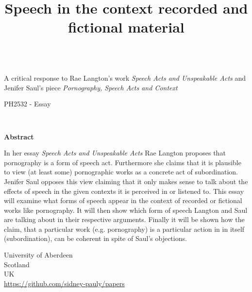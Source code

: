 \documentclass[14pt]{article}
\begin{document}
\title{Speech in the context recorded and fictional material}
\date{}



\fancyhf{}


\begin{titlepage}
  \begin{center}
    \Large
    \textbf{\thetitle}
    \\
    A critical response to Rae Langton's work \textit{Speech Acts and Unspeakable Acts}
    and Jenifer Saul's piece \textit{Pornography, Speech Acts and Context}
        
    \vspace{0.4cm}
    \large
    PH2532 - Essay
        
    \vspace{0.4cm}
    \textbf{\theauthor}\\
    \textbf{\theuoastudentid}

    \vspace{0.9cm}
    \textbf{Abstract}

  \end{center}

  In her essay \textit{Speech Acts and Unspeakable Acts} Rae Langton proposes that pornography is a form of speech act. Furthermore
  she claims that it is plausible to view (at least some) pornographic works as a concrete act of subordination. Jenifer Saul opposes this
  view claiming that it only makes sense to talk about the effects of speech in the given contexts it is perceived in or listened to. This essay will 
  examine what forms of speech appear in the context of recorded or fictional works like pornography. It will then show which form of speech 
  Langton and Saul are talking about in their respective arguments. Finally it will be shown how the claim, that a particular work (e.g. pornography)
  is a particular action in in itself (subordination), can be coherent in spite of Saul's objections.

  \vfill

  \begin{center}

    University of Aberdeen\\
    Scotland\\
    UK\\
    \thedate
    \vspace{0.4cm}
    \url{https://github.com/sidney-pauly/papers}
  \end{center}
\end{titlepage}
\end{document}
